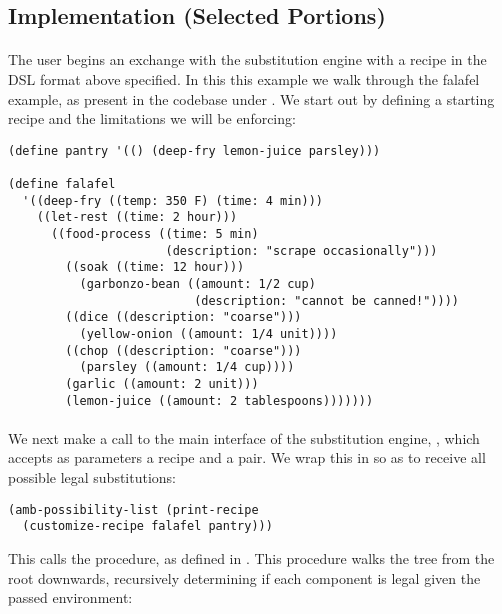 \subsection{Implementation (Selected Portions)}
\paragraph{}
The user begins an exchange with the substitution engine with a recipe in the DSL format above specified. In this this example we walk through the falafel example, as present in the codebase under . We start out by defining a starting recipe and the limitations we will be enforcing:

\begin{verbatim}
(define pantry '(() (deep-fry lemon-juice parsley)))

(define falafel
  '((deep-fry ((temp: 350 F) (time: 4 min)))
    ((let-rest ((time: 2 hour)))
      ((food-process ((time: 5 min)
                      (description: "scrape occasionally")))
        ((soak ((time: 12 hour)))
          (garbonzo-bean ((amount: 1/2 cup)
                          (description: "cannot be canned!"))))
        ((dice ((description: "coarse")))
          (yellow-onion ((amount: 1/4 unit))))
        ((chop ((description: "coarse")))
          (parsley ((amount: 1/4 cup))))
        (garlic ((amount: 2 unit)))
        (lemon-juice ((amount: 2 tablespoons)))))))
\end{verbatim}

\paragraph{}
We next make a call to the main interface of the substitution engine, , which accepts as parameters a recipe and a  pair. We wrap this in  so as to receive all possible legal substitutions:

\begin{verbatim}
(amb-possibility-list (print-recipe
  (customize-recipe falafel pantry)))
\end{verbatim}

This calls the  procedure, as defined in . This procedure walks the tree from the root downwards, recursively determining if each component is legal given the passed environment:


